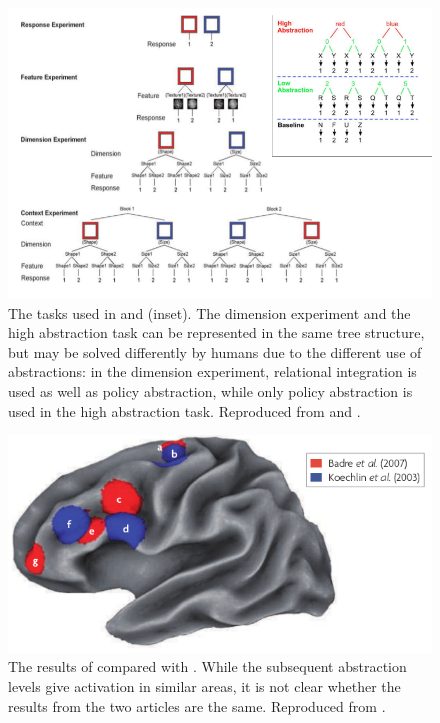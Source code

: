 \documentclass[10pt,a4paper]{report}
\begin{document}
\begin{figure}[bthp]
\begin{center}
\includegraphics[width=\textwidth]{figures/taskBadreReynolds.png}
\caption{The tasks used in \citet{Badre2007} and \citet{Reynolds2012} (inset). The dimension experiment and the high abstraction task can be represented in the same tree structure, but may be solved differently by humans due to the different use of abstractions: in the dimension experiment, relational integration is used as well as policy abstraction, while only policy abstraction is used in the high abstraction task. Reproduced from \citet{Badre2007} and \citet{Reynolds2012}. }
\label{taskBadreReynolds}
\end{center}
\end{figure}

\begin{figure}[bthp]
\begin{center}
\includegraphics[width=\textwidth]{figures/BadreKoechlin.png}
\caption{The results of \citet{Koechlin2003} compared with \citet{Badre2007}. While the subsequent abstraction levels give activation in similar areas, it is not clear whether the results from the two articles are the same. Reproduced from \citet{Badre2009}. }
\label{BadreKoechlin}
\end{center}
\end{figure}
\end{document}
